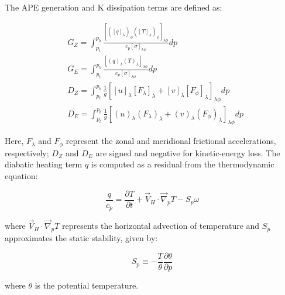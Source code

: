 \documentclass[pdflatex,sn-chicago]{sn-jnl}%
\theoremstyle{plain}
\theoremstyle{definition}
\theoremstyle{remark}
\theoremstyle{definition}
\begin{document}
The APE generation and K dissipation terms are defined as:

\begin{align}
    &G_Z =  \int_{p_t}^{p_b} \frac{[([q]_\lambda)_\phi ([T]_\lambda)_\phi]_{\lambda \phi}}{c_p[\sigma]_{\lambda \phi}} dp \\
    &G_E =  \int_{p_t}^{p_b} \frac{[(q)_\lambda (T)_\lambda]_{\lambda \phi}}{c_p[\sigma]_{\lambda \phi}} dp \\
    &D_Z = \int_{p_t}^{p_b} \frac{1}{g} [[u]_\lambda [F_\lambda]_\lambda + [v]_\lambda [F_\phi]_\lambda]_{\lambda \phi} dp \\
    &D_E = \int_{p_t}^{p_b} \frac{1}{g} [(u)_\lambda (F_\lambda)_\lambda + (v)_\lambda (F_\phi)_\lambda]_{\lambda \phi} dp
\end{align}

Here, $F_{\lambda}$ and $F_{\phi}$ represent the zonal and meridional frictional accelerations, respectively; $D_Z$ and $D_E$ are signed and negative for kinetic-energy loss. The diabatic heating term $q$ is computed as a residual from the thermodynamic equation:

\begin{equation}
    \frac{q}{c_p} = \frac{\partial T}{\partial t} + \Vec{V}_H \cdot \Vec{\nabla}_p T - S_p\omega
\end{equation}

where $\Vec{V}_H \cdot \Vec{\nabla}_p T$ represents the horizontal advection of temperature and $S_p$ approximates the static stability, given by:

\begin{equation}
    S_p \equiv -\frac{T}{\theta}\frac{\partial \theta}{\partial p}
\end{equation}

where $\theta$ is the potential temperature. 
\end{document}
